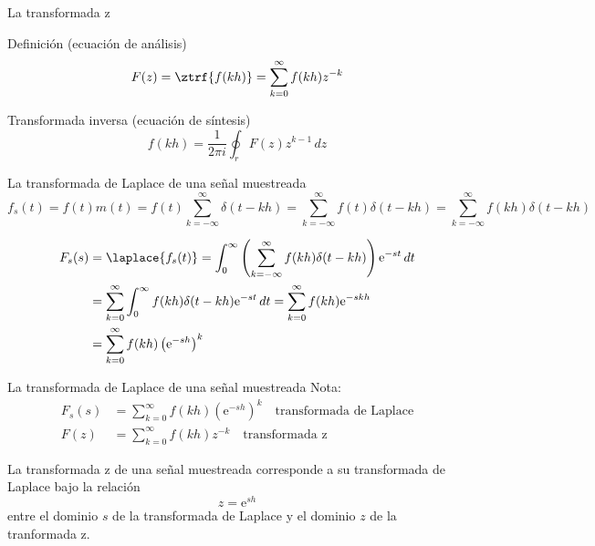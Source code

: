 \documentclass[presentation,aspectratio=169]{beamer}
\begin{document}
\begin{frame}[label={sec:org4b158ad}]{La transformada z}
\begin{block}{Definición (ecuación de análisis)}
\[ F(z) = \ztrf{f(kh)} = \sum_{k=0}^{\infty} f(kh)z^{-k} \]
\end{block}

\begin{block}{Transformada inversa (ecuación de síntesis)}
\[ f(kh) = \frac{1}{2\pi i} \oint_r F(z) z^{k-1} \, dz \]
\end{block}
\end{frame}

\begin{frame}[label={sec:org6b855f6}]{La transformada de Laplace de una señal muestreada}
\[f_s(t) = f(t)m(t) = f(t) \sum_{k=-\infty}^{\infty} \delta(t-kh) = \sum_{k=-\infty}^{\infty} f(t)\delta(t-kh) = \sum_{k=-\infty}^{\infty} f(kh) \delta(t-kh) \]

\begin{align*}
F_s(s) &= \laplace{f_s(t)} = \int_0^\infty \left(\sum_{k=-\infty}^{\infty} f(kh) \delta(t-kh)\right)\mathrm{e}^{-st}\, dt \\
&= \sum_{k=0}^{\infty} \int_0^\infty  f(kh) \delta(t-kh) \mathrm{e}^{-st}\, dt = \sum_{k=0}^{\infty} f(kh) \mathrm{e}^{-skh}\\
&= \sum_{k=0}^{\infty} f(kh) \left(\mathrm{e}^{-sh}\right)^k
\end{align*}
\end{frame}

\begin{frame}[label={sec:org858df9a}]{La transformada de Laplace de una señal muestreada}
Nota:
\begin{align*}
F_s(s) &=  \sum_{k=0}^{\infty} f(kh) \left(\mathrm{e}^{-sh}\right)^k\quad \text{transformada de Laplace}\\
F(z) &= \sum_{k=0}^{\infty} f(kh) z^{-k} \quad \text{transformada z}
\end{align*}

\begin{tcolorbox}
La transformada z de una señal muestreada corresponde a su transformada de Laplace bajo la relación 
\[ z = \mathrm{e}^{sh}\]
entre el dominio $s$ de la transformada de Laplace y el dominio $z$ de la tranformada z.
\end{tcolorbox}
\end{frame}
\end{document}
